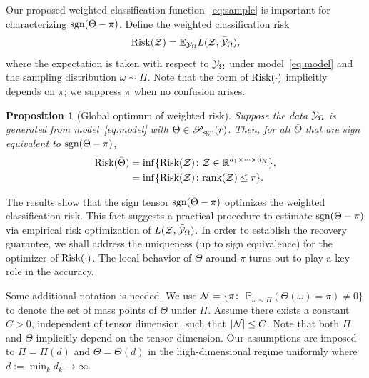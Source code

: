 \documentclass[11pt]{article}
\theoremstyle{plain}
\newtheorem{prop}{Proposition}
\theoremstyle{definition}
\def\sign{\textup{sgn}}
\def\caliP{\mathscr{P}_{\textup{sgn}}}
\def\risk{\textup{Risk}}
\begin{document}
Our proposed weighted classification function~\eqref{eq:sample} is important for characterizing $\sign(\Theta-\pi)$. Define the weighted classification risk 
\begin{equation}\label{eq:population}
\textup{Risk}(\mathcal{Z})=\mathbb{E}_{\mathcal{Y}_\Omega}L(\mathcal{Z},\bar{\mathcal{Y}}_\Omega),
\end{equation}
where the expectation is taken with respect to $\mathcal{Y}_\Omega$ under model~\eqref{eq:model} and the sampling distribution $\omega\sim\Pi$. Note that the form of $\textup{Risk}(\cdot)$ implicitly depends on $\pi$; we suppress $\pi$ when no confusion arises. 
\begin{prop}[Global optimum of weighted risk]\label{prop:global}
Suppose the data $\mathcal{Y}_\Omega$ is generated from model~\eqref{eq:model} with $\Theta \in \caliP(r)$. Then, for all $\bar \Theta$ that are sign equivalent to $\sign(\Theta-\pi)$, 
\begin{align}\label{eq:optimal}
\textup{Risk}(\bar \Theta )&=\inf\{\textup{Risk}(\mathcal{Z})\colon \mathcal{Z}\in\mathbb{R}^{d_1\times \cdots \times d_K}\},\notag \\
&=\inf\{\textup{Risk}(\mathcal{Z})\colon \textup{rank} (\mathcal{Z})\leq r\}.
\end{align}
\end{prop}
The results show that the sign tensor $\sign(\Theta-\pi)$ optimizes the weighted classification risk. This fact suggests a practical procedure to estimate $\sign(\Theta-\pi)$ via empirical risk optimization of $L(\mathcal{Z},\bar {\mathcal{Y}}_\Omega)$. In order to establish the recovery guarantee, we shall address the uniqueness (up to sign equivalence) for the optimizer of $\risk(\cdot)$. The local behavior of $\Theta$ around $\pi$ turns out to play a key role in the accuracy. 

Some additional notation is needed. We use $\mathcal{N}=\{\pi\colon$  $\mathbb{P}_{\omega\sim \Pi}(\Theta(\omega)=\pi)\neq 0\}$ to denote the set of mass points of $\Theta$ under $\Pi$. Assume there exists a constant $C>0$, independent of tensor dimension, such that $|\mathcal{N}|\leq C$. Note that both $\Pi$ and $\Theta$ implicitly depend on the tensor dimension. Our assumptions are imposed to $\Pi=\Pi(d)$ and $\Theta=\Theta(d)$ in the high-dimensional regime uniformly where $d:=\min_kd_k\to\infty$. 
\end{document}
